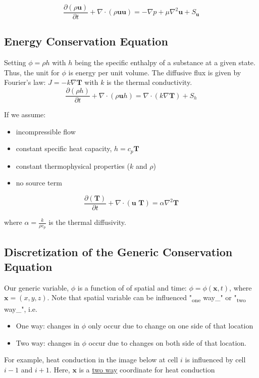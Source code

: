 \documentclass[11pt]{article}
\begin{document}
\begin{equation}
\frac{\partial (\rho \textbf{u})}{\partial t} + \nabla \cdot (\rho \textbf{uu})  = -\nabla p + \mu \nabla^2
\textbf{u} + S_\textbf{u}
\end{equation}

\subsection{Energy Conservation Equation}
\label{sec:org4f7fb1d}
Setting \(\phi = \rho h\) with \(h\) being the specific enthalpy of a substance at a given state. Thus, the unit for \(\phi\) is
energy per unit volume. The diffusive flux is given by Fourier's law: \(J = -k \nabla \textbf{T}\) with \(k\) is the thermal conductivity.
\begin{equation}
\frac{\partial (\rho h)}{\partial t} + \nabla \cdot (\rho \textbf{u} h)  = \nabla \cdot (k \nabla \textbf{T}) +
S_h
\end{equation}

If we assume:
\begin{itemize}
\item incompressible flow
\item constant specific heat capacity, \(h = c_p \textbf{T}\)
\item constant thermophysical properties (\(k\) and \(\rho\))
\item no source term
\end{itemize}

\begin{equation}
\frac{\partial (\textbf{T})}{\partial t} + \nabla \cdot (\textbf{u T})  = \alpha \nabla ^2 \textbf{T}
\end{equation}

where \(\alpha = \frac{k}{\rho c_p}\) is the thermal diffusivity. 

\subsection{Discretization of the Generic Conservation Equation}
\label{sec:org9859035}
Our generic variable, \(\phi\) is a function of of spatial and time: \(\phi = \phi (\textbf{x},t)\), where
\(\textbf{x} = (x,y,z)\). Note that spatial variable can be influenced "\textsubscript{one} way\_" or "\textsubscript{two} way\_", i.e.
\begin{itemize}
\item One way: changes in \(\phi\) only occur due to change on one side of that location
\item Two way: changes in \(\phi\) occur due to changes on both side of that location.
\end{itemize}
For example, heat conduction in the image below at cell \(i\) is influenced by cell \(i-1\) and
\(i+1\). Here, \(\textbf{x}\) is a \uline{two way} coordinate for heat conduction
\end{document}

